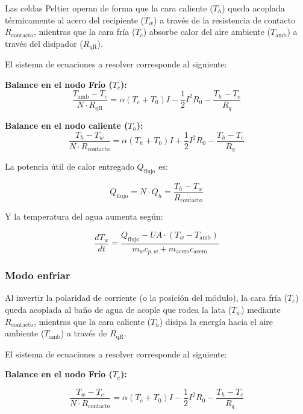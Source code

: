 \documentclass[12pt, a4paper]{article}
\begin{document}
Las celdas Peltier operan de forma que la cara caliente ($T_h$) queda acoplada térmicamente al acero del recipiente ($T_w$) a través de la resistencia de contacto $R_{\text{contacto}}$, mientras que la cara fría ($T_c$) absorbe calor del aire ambiente ($T_{\text{amb}}$) a través del disipador ($R_{\text{qR}}$).

El sistema de ecuaciones a resolver corresponde al siguiente:

\textbf{Balance en el nodo Frío ($T_c$):} 
\begin{equation}
    \frac{T_{\text{amb}} - T_c}{N \cdot R_{\text{qR}}} = \alpha (T_c + T_0) I - \frac{1}{2} I^2 R_0 - \frac{T_h - T_c}{R_q}    
\end{equation}


\textbf{Balance en el nodo caliente ($T_h$):} 
\begin{equation}
    \frac{T_h - T_w}{N \cdot R_{\text{contacto}}} = \alpha (T_h + T_0) I + \frac{1}{2} I^2 R_0 - \frac{T_h - T_c}{R_q}
\end{equation}

La potencia útil de calor entregado $Q_{\text{flujo}}$ es:

\begin{equation}
    Q_{\text{flujo}} = N \cdot Q_h = \frac{T_h - T_w}{R_{\text{contacto}}}    
\end{equation}


Y la temperatura del agua aumenta según:

\begin{equation}
    \frac{dT_w}{dt} = \frac{Q_{\text{flujo}} - UA \cdot (T_w - T_{\text{amb}})}{m_w c_{p,w} + m_{\text{acero}} c_{\text{acero}}}
\end{equation}

\subsubsection*{Modo enfriar}

Al invertir la polaridad de corriente (o la posición del módulo), la cara fría ($T_c$) queda acoplada al baño de agua de acople que rodea la lata ($T_w$) mediante $R_{\text{contacto}}$, mientras que la cara caliente ($T_h$) disipa la energía hacia el aire ambiente ($T_{\text{amb}}$) a través de $R_{\text{qR}}$.

El sistema de ecuaciones a resolver corresponde al siguiente:

\textbf{Balance en el nodo Frío ($T_c$):}

\begin{equation}
    \frac{T_w - T_c}{N \cdot R_{\text{contacto}}} = \alpha (T_c + T_0) I - \frac{1}{2} I^2 R_0 - \frac{T_h - T_c}{R_q}
\end{equation}
\end{document}

